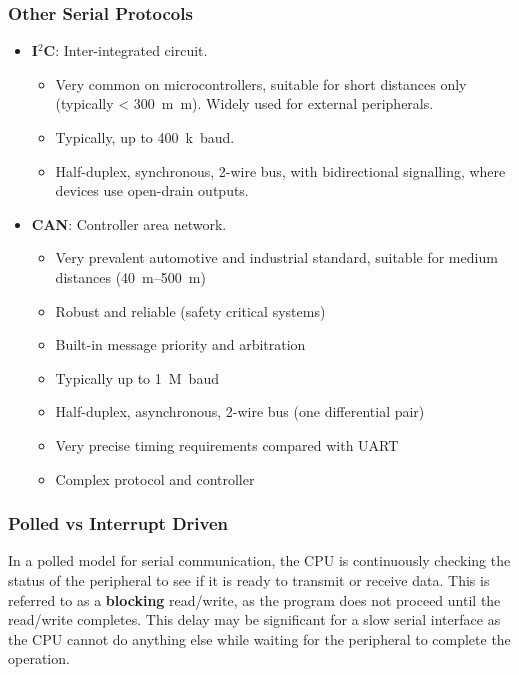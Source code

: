 \documentclass{article}
\begin{document}
\subsubsection{Other Serial Protocols}
\begin{itemize}
    \item \textbf{I\({}^2\)C}: Inter-integrated circuit.
          \begin{itemize}
              \item Very common on microcontrollers, suitable for short
                    distances only (typically < \qty{300}{m.m}). Widely
                    used for external peripherals.
              \item Typically, up to \qty{400}{k.baud}.
              \item Half-duplex, synchronous, 2-wire bus, with
                    bidirectional signalling, where devices use
                    open-drain outputs.
          \end{itemize}
    \item \textbf{CAN}: Controller area network.
          \begin{itemize}
              \item Very prevalent automotive and industrial standard,
                    suitable for medium distances
                    (\qtyrange{40}{500}{m})
              \item Robust and reliable (safety critical systems)
              \item Built-in message priority and arbitration
              \item Typically up to \qty{1}{M.baud}
              \item Half-duplex, asynchronous, 2-wire bus (one
                    differential pair)
              \item Very precise timing requirements compared with UART
              \item Complex protocol and controller
          \end{itemize}
\end{itemize}
\subsubsection{Polled vs Interrupt Driven}
In a polled model for serial communication, the CPU is continuously
checking the status of the peripheral to see if it is ready to transmit
or receive data. This is referred to as a \textbf{blocking} read/write,
as the program does not proceed until the read/write completes. This
delay may be significant for a slow serial interface as the CPU cannot
do anything else while waiting for the peripheral to complete the
operation.
\end{document}
